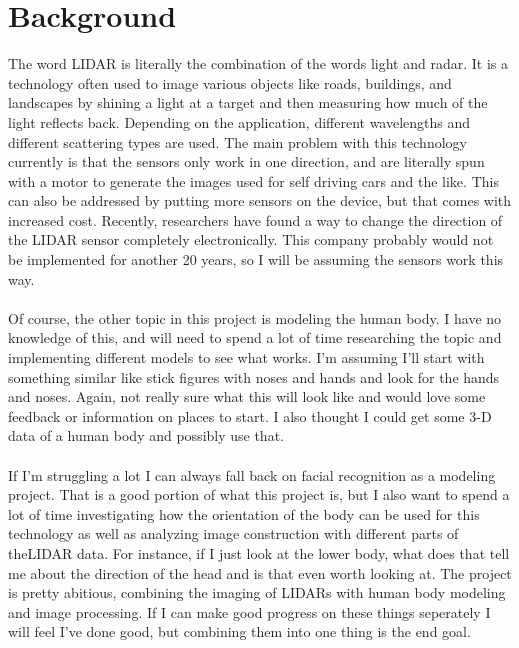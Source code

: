 \documentclass[a4paper]{article}
\begin{document}
\section{Background}
The word LIDAR is literally the combination of the words light and radar.
It is a technology often used to image various objects like roads, buildings, and landscapes by shining a light at a target and then measuring how much of the light reflects back.  
Depending on the application, different wavelengths and different scattering types are used.
The main problem with this technology currently is that the sensors only work in one direction, and are literally spun with a motor to generate the images used for self driving cars and the like.
This can also be addressed by putting more sensors on the device, but that comes with increased cost.
Recently, researchers have found a way to change the direction of the LIDAR sensor completely electronically.
This company probably would not be implemented for another 20 years, so I will be assuming the sensors work this way.
\\
\\
Of course, the other topic in this project is modeling the human body. I have no knowledge of this, and will need to spend a lot of time researching the topic and implementing different models to see what works.
I'm assuming I'll start with something similar like stick figures with noses and hands and look for the hands and noses.
Again, not really sure what this will look like and would love some feedback or information on places to start.
I also thought I could get some 3-D data of a human body and possibly use that.
\\
\\
If I'm struggling a lot I can always fall back on facial recognition as a modeling project.
That is a good portion of what this project is, but I also want to spend a lot of time investigating how the orientation of the body can be used for this technology as well as analyzing image construction with different parts of theLIDAR data.
For instance, if I just look at the lower body, what does that tell me about the direction of the head and is that even worth looking at.
The project is pretty abitious, combining the imaging of LIDARs with human body modeling and image processing.
If I can make good progress on these things seperately I will feel I've done good, but combining them into one thing is the end goal.
\clearpage
\end{document}
